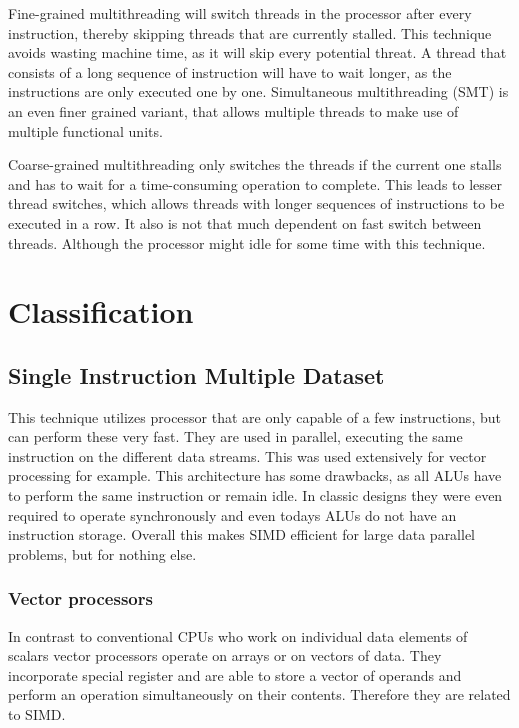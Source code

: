 \documentclass{article}
\begin{document}
	Fine-grained multithreading will switch threads in the processor after every instruction,
	thereby skipping threads that are currently stalled.
	This technique avoids wasting machine time,
	as it will skip every potential threat.
	A thread that consists of a long sequence of instruction will have to wait longer,
	as the instructions are only executed one by one.
	Simultaneous multithreading (SMT) is an even finer grained variant,
	that allows multiple threads to make use of multiple functional units.

	Coarse-grained multithreading only switches the threads if the current one stalls
	and has to wait for a time-consuming operation to complete.
	This leads to lesser thread switches,
	which allows threads with longer sequences of instructions to be executed in a row.
	It also is not that much dependent on fast switch between threads.
	Although the processor might idle for some time with this technique.
\section{Classification} %
\label{sec:classification}

\subsection{Single Instruction Multiple Dataset} %
\label{sub:single_instruction_multiple_dataset}
	This technique utilizes processor that are only capable of a few instructions,
	but can perform these very fast.
	They are used in parallel, executing the same instruction on the different data streams. 
	This was used extensively for vector processing for example.
	This architecture has some drawbacks,
	as all ALUs have to perform the same instruction or remain idle.
	In classic designs they were even required to operate synchronously
	and even todays ALUs do not have an instruction storage.
	Overall this makes SIMD efficient for large data parallel problems,
	but for nothing else.

	\subsubsection{Vector processors} %
	\label{ssub:vector_processors}
	In contrast to conventional CPUs who work on individual data elements of scalars
	vector processors operate on arrays or on vectors of data.
	They incorporate special register and are able to store a vector of operands 
	and perform an operation simultaneously on their contents.
	Therefore they are related to SIMD.
\end{document}

